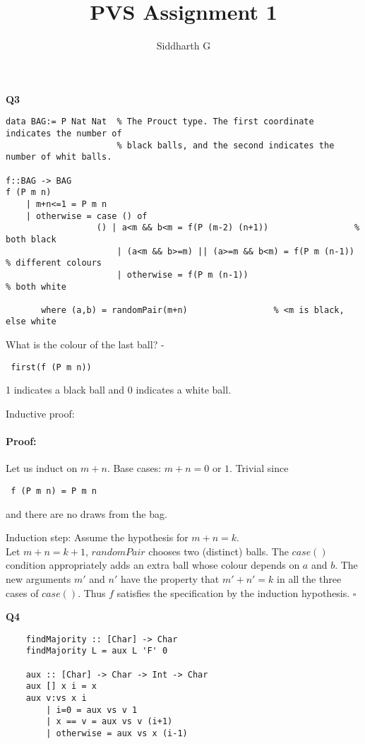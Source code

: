 \documentclass[a4paper]{article}
\title{PVS Assignment 1}
\author{Siddharth G}
\date{\vspace{-5ex}}
\newenvironment{proof}{\paragraph{Proof:}}{\hfill$\square$}
\begin{document}
\maketitle

\itemize

\item \textbf{Q3}
\begin{verbatim}
data BAG:= P Nat Nat  % The Prouct type. The first coordinate indicates the number of 
                      % black balls, and the second indicates the number of whit balls.

f::BAG -> BAG
f (P m n)
	| m+n<=1 = P m n
	| otherwise = case () of 
				  () | a<m && b<m = f(P (m-2) (n+1))                 % both black
				  	  | (a<m && b>=m) || (a>=m && b<m) = f(P m (n-1)) % different colours
				  	  | otherwise = f(P m (n-1))                      % both white

       where (a,b) = randomPair(m+n)                 % <m is black, else white
\end{verbatim}

What is the colour of the last ball? - 
\begin{verbatim} first(f (P m n)) \end{verbatim} 
1 indicates a black ball and 0 indicates a white ball.

Inductive proof:
\begin{proof}
Let us induct on $m+n$. 
Base cases: $m+n=0$ or $1$. Trivial since  \begin{verbatim} f (P m n) = P m n \end{verbatim} and there are no draws from the bag.

Induction step: Assume the hypothesis for $m+n=k$. \\
 Let $m+n=k+1$, 
 $randomPair$ chooses two (distinct) balls. The $case ()$ condition appropriately adds an extra ball whose colour depends on $a$ and $b$. The new arguments $m'$ and $n'$  have the property that $m'+n'=k$ in all the three cases of $case()$. Thus $f$ satisfies the specification by the induction hypothesis.
\end{proof}
\newpage

\item \textbf{Q4}
\begin{verbatim}
	findMajority :: [Char] -> Char
	findMajority L = aux L 'F' 0
	
	aux :: [Char] -> Char -> Int -> Char
	aux [] x i = x
	aux v:vs x i
		| i=0 = aux vs v 1
		| x == v = aux vs v (i+1)
		| otherwise = aux vs x (i-1)
\end{verbatim} 
\end{document}

